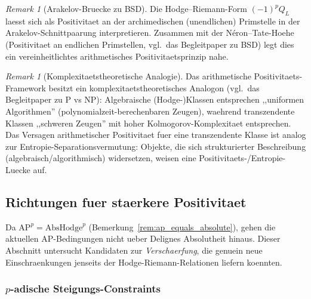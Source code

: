 \documentclass[aps,prd,twocolumn,superscriptaddress,nofootinbib]{revtex4-2}
\theoremstyle{definition}
\theoremstyle{remark}
\newtheorem{remark}[theorem]{Remark}
\begin{document}
\begin{remark}[Arakelov-Bruecke zu BSD]
\label{rem:arakelov-bridge}
Die Hodge--Riemann-Form $(-1)^p Q_L$ laesst sich als Positivitaet an der archimedischen (unendlichen) Primstelle in der Arakelov-Schnittpaarung interpretieren. Zusammen mit der N\'eron--Tate-Hoehe (Positivitaet an endlichen Primstellen, vgl.\ das Begleitpaper zu BSD) legt dies ein vereinheitlichtes arithmetisches Positivitaetsprinzip nahe.
\end{remark}

\begin{remark}[Komplexitaetstheoretische Analogie]
\label{rem:pnp-analogy}
Das arithmetische Positivitaets-Framework besitzt ein komplexitaetstheoretisches Analogon (vgl.\ das Begleitpaper zu P vs NP): Algebraische (Hodge-)Klassen entsprechen ,,uniformen Algorithmen'' (polynomialzeit-berechenbaren Zeugen), waehrend transzendente Klassen ,,schweren Zeugen'' mit hoher Kolmogorov-Komplexitaet entsprechen. Das Versagen arithmetischer Positivitaet fuer eine transzendente Klasse ist analog zur Entropie-Separationsvermutung: Objekte, die sich strukturierter Beschreibung (algebraisch/algorithmisch) widersetzen, weisen eine Positivitaets-/Entropie-Luecke auf.
\end{remark}


\subsection{Richtungen fuer staerkere Positivitaet}
\label{sec:stronger_positivity}

Da $\mathrm{AP}^p = \mathrm{AbsHodge}^p$ (Bemerkung~\ref{rem:ap_equals_absolute}), gehen die aktuellen AP-Bedingungen nicht ueber Delignes Absolutheit hinaus. Dieser Abschnitt untersucht Kandidaten zur \textit{Verschaerfung}, die genuein neue Einschraenkungen jenseits der Hodge-Riemann-Relationen liefern koennten.

\subsubsection{$p$-adische Steigungs-Constraints}
\end{document}
